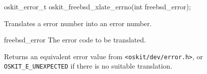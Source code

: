 \begin{apisyn}

	\funcproto oskit_error_t oskit_freebsd_xlate_errno(int freebsd_error);
\end{apisyn}
\ostodrv
\begin{apidesc}
	Translates a \freebsd{} error number into an \oskit{} error number.
\end{apidesc}
\begin{apiparm}
	\item[freebsd_error]
		The \freebsd{} error code to be translated.
\end{apiparm}
\begin{apiret}
	Returns an equivalent error value from {\tt <oskit/dev/error.h>},
	or {\tt OSKIT_E_UNEXPECTED} if there is no suitable translation.
\end{apiret}
